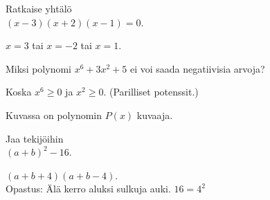 \begin{tehtavasivu}
\begin{tehtava} 
Ratkaise yhtälö \\ $(x-3)(x+2)(x-1)=0$.
    \begin{vastaus}
		$x=3$ tai $x=-2$ tai $x=1$.
    \end{vastaus}
\end{tehtava}

\begin{tehtava} 
Miksi polynomi $x^6+3x^2+5$ ei voi saada negatiivisia arvoja?
    \begin{vastaus}
		Koska $x^6\geq 0$ ja $x^2 \geq 0$. (Parilliset potenssit.)
    \end{vastaus}
\end{tehtava}

\begin{tehtava} 
    \begin{vastaus}
    \end{vastaus}
\end{tehtava}

\begin{tehtava} 
Kuvassa on polynomin $P(x)$ kuvaaja.
\begin{kuvaajapohja}{0.8}{-3}{3}{-2}{4}
\end{kuvaajapohja}

    \begin{vastaus}
    \end{vastaus}
\end{tehtava}

\begin{tehtava} 
Jaa tekijöihin \\ $(a+b)^2-16$.
    \begin{vastaus}
		$(a+b+4)(a+b-4)$. \\
    Opastus: Älä kerro aluksi sulkuja auki. $16=4^2$
    \end{vastaus}
\end{tehtava}


\end{tehtavasivu}
